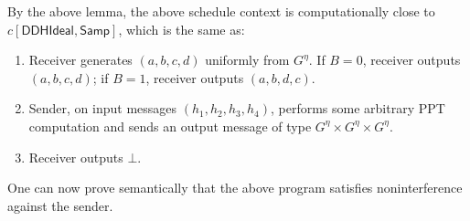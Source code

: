\documentclass{article}
\begin{document}
By the above lemma, the above schedule context is computationally close to $c[\textsf{DDHIdeal}, \textsf{Samp}]$, which is the same as:
\begin{enumerate}
    \item Receiver generates $(a,b,c,d)$ uniformly from $G^\eta$. If $B=0$, receiver outputs $(a,b,c,d)$; if $B=1$, receiver outputs $(a,b,d,c)$.
    \item Sender, on input messages $(h_1, h_2, h_3, h_4)$, performs some arbitrary PPT computation and sends an output message of type $G^\eta \times G^\eta \times G^\eta$.
    \item Receiver outputs $\bot$.
\end{enumerate}

One can now prove semantically that the above program satisfies noninterference against the sender. 
\end{document}
